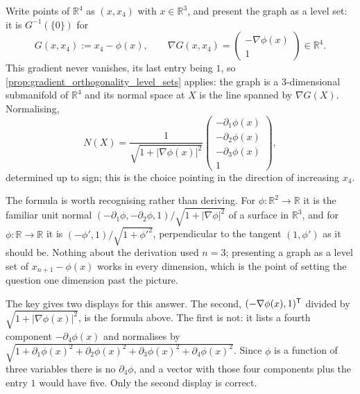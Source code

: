 \begin{exercisesolution}
\label{sol:box_normal_to_a_graph_in_r4}
Write points of $\mathbb{R}^4$ as $(x,x_4)$ with $x \in \mathbb{R}^3$, and present the graph as a
level set: it is $G^{-1}(\{0\})$ for
\[G(x,x_4) := x_4 - \phi(x), \qquad
  \nabla G(x,x_4) = \begin{pmatrix} -\nabla\phi(x) \\ 1 \end{pmatrix} \in \mathbb{R}^4 .\]
This gradient never vanishes, its last entry being $1$, so
\cref{prop:gradient_orthogonality_level_sets} applies: the graph is a $3$-dimensional submanifold
of $\mathbb{R}^4$ and its normal space at $X$ is the line spanned by $\nabla G(X)$. Normalising,
\[N(X) = \frac{1}{\sqrt{1+\lvert\nabla\phi(x)\rvert^2}}
  \begin{pmatrix} -\partial_1\phi(x) \\ -\partial_2\phi(x) \\ -\partial_3\phi(x) \\ 1
  \end{pmatrix},\]
determined up to sign; this is the choice pointing in the direction of increasing $x_4$.

The formula is worth recognising rather than deriving. For $\phi : \mathbb{R}^2 \to \mathbb{R}$
it is the familiar unit normal $(-\partial_1\phi,-\partial_2\phi,1)/\sqrt{1+\lvert\nabla\phi
\rvert^2}$ of a surface in $\mathbb{R}^3$, and for $\phi : \mathbb{R} \to \mathbb{R}$ it is
$(-\phi',1)/\sqrt{1+\phi'^2}$, perpendicular to the tangent $(1,\phi')$ as it should be. Nothing
about the derivation used $n = 3$; presenting a graph as a level set of $x_{n+1} - \phi(x)$ works
in every dimension, which is the point of setting the question one dimension past the picture.

\begin{ainote}
The key gives two displays for this answer. The second, $(-\nabla\phi(x),1)^{\mathsf{T}}$ divided by
$\sqrt{1+\lvert\nabla\phi(x)\rvert^2}$, is the formula above. The first is not: it lists a fourth
component $-\partial_4\phi(x)$ and normalises by
$\sqrt{1+\partial_1\phi(x)^2+\partial_2\phi(x)^2+\partial_3\phi(x)^2+\partial_4\phi(x)^2}$. Since
$\phi$ is a function of three variables there is no $\partial_4\phi$, and a vector with those
four components plus the entry $1$ would have five. Only the second display is correct.
\end{ainote}
\end{exercisesolution}

